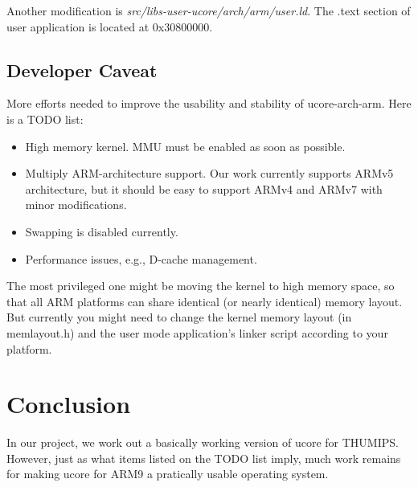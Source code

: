 \documentclass[a4paper]{article}
\begin{document}
Another modification is \emph{src/libs-user-ucore/arch/arm/user.ld}.
The .text section of user application is located at  0x30800000.

\subsection{Developer Caveat}
More efforts needed to improve the usability and stability of ucore-arch-arm. Here is a TODO list:
\begin{itemize}
  \item High memory kernel. MMU must be enabled as soon as possible.
  \item Multiply ARM-architecture support. Our work currently supports
    ARMv5 architecture, but it should be easy to support ARMv4 and ARMv7
    with minor modifications.
  \item Swapping is disabled currently.
  \item Performance issues, e.g., D-cache management.
\end{itemize}

The most privileged one might be moving the kernel to high memory space, so that all ARM platforms
can share identical (or nearly identical) memory layout. But currently you might need to change
the kernel memory layout (in memlayout.h) and the user mode application's linker script 
according to your platform.


\section{Conclusion}
In our project, we work out a basically working version of ucore for THUMIPS.
However, just as what items listed on the TODO list imply,
much work remains for making ucore for ARM9 a pratically usable
operating system.






\end{document}
